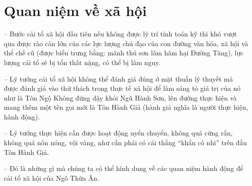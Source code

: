 \section{Quan niệm về xã hội} %
\label{sec:13_xa_hoi}

-- Bước cải tổ xã hội đầu tiên nếu không được lý trí tính toán kỹ thì khó vượt qua được rào cản lớn của các lực lượng chủ đạo của con đường văn hóa, xã hội và thể chế cũ (được biểu trưng bằng: mãnh thú sơn lâm hãm hại Đường Tăng), lực lượng cải tổ sẽ bị tổn thất nặng, có thể bị lâm nguy.

-- Lý tưởng cải tổ xã hội không thể đánh giá đúng ở mặt thuần lý thuyết mà được đánh giá vào thử thách trong thực tế xã hội để làm sáng tỏ giá trị của nó như là Tôn Ngộ Không đứng dậy khỏi Ngũ Hành Sơn, lên đường thực hiện và mang thêm một tên gọi mới là Tôn Hành Giả (hành giả nghĩa là người thực hiện, hành động).

-- Lý tưởng thực hiện cần được hoạt động uyển chuyển, không quá cứng rắn, không quá nôn nóng, vội vàng, như cần phải có cái thắng ``khẩn cô nhi'' trên đầu Tôn Hành Giả.

-- Đó là những gì mà chúng ta có thể hình dung về các quan niệm hành động để cải tổ xã hội của Ngô Thừa Ân.
